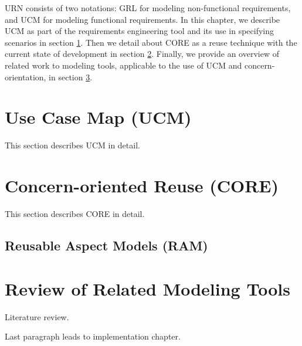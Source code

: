 URN consists of two notations: GRL for modeling non-functional requirements, and UCM for modeling functional requirements. In this chapter, we describe UCM as part of the requirements engineering tool and its use in specifying scenarios in section \ref{sec:2.1}. Then we detail about CORE as a reuse technique with the current state of development in section \ref{sec:2.2}. Finally, we provide an overview of related work to modeling tools, applicable to the use of UCM and concern-orientation, in section \ref{sec:2.3}.

\section{Use Case Map (UCM)} \label{sec:2.1}

This section describes UCM in detail.

\section{Concern-oriented Reuse (CORE)} \label{sec:2.2}

This section describes CORE in detail.

\subsection{Reusable Aspect Models (RAM)}

\section{Review of Related Modeling Tools} \label{sec:2.3}

Literature review.

Last paragraph leads to implementation chapter.

